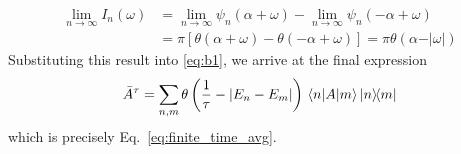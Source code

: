 \begin{align}
    \lim_{n \to \infty} I_n(\omega ) & = \lim_{n \to \infty} \psi _n(\alpha + \omega ) - \lim_{n \to \infty} \psi _n(-\alpha +\omega )\nonumber              \\
                                     & = \pi \left[ \theta (\alpha +\omega ) - \theta(-\alpha +\omega ) \right] = \pi \theta (\alpha - \vert \omega  \vert )
\end{align}
Substituting this result into \eqref{eq:b1}, we arrive at the final expression
\begin{equation}
    \bar{A}^{\tau } = \sum_{n,m} \theta \left( \frac{1}{\tau }- \left\vert E_n - E_m \right\vert  \right)   \matrixel{n}{A}{m} \ketbra{n}{m}
\end{equation}
which is precisely Eq.~\eqref{eq:finite_time_avg}.